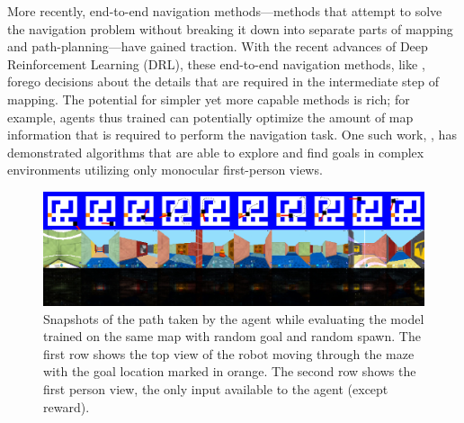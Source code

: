 More recently, end-to-end navigation methods---methods that attempt to  
solve the navigation problem without breaking it down into separate parts of mapping and path-planning---have gained traction.
%
With the recent advances of Deep Reinforcement Learning (DRL), these end-to-end navigation methods, like \cite{MnBaMiICML2016,SiHuMaNATURE2016,LePaKrISER2017,MiPaViICLR2017,OhChSiICML2016}, forego decisions about the details that are required in the intermediate step of mapping.
The potential for simpler yet more capable methods is rich; for example, agents thus trained can potentially optimize the amount of map information that is required to perform the navigation task.
One such work, \cite{MiPaViICLR2017}, has demonstrated algorithms that are able to explore and find goals in complex environments utilizing only monocular first-person views.

\begin{figure}
\includegraphics[width=\textwidth,trim=0 336pt 0 0,clip]{./exp-results/training-09x09-0127-on-0127.png}%
\caption{
Snapshots of the path taken by the agent while evaluating the model trained on the same map with random goal and random spawn.
The first row shows the top view of the robot moving through the maze with the goal location marked in orange. The second row shows the first person view, the only input available to the agent (except reward).}
\label{fig:training-qualitative}
\end{figure}

